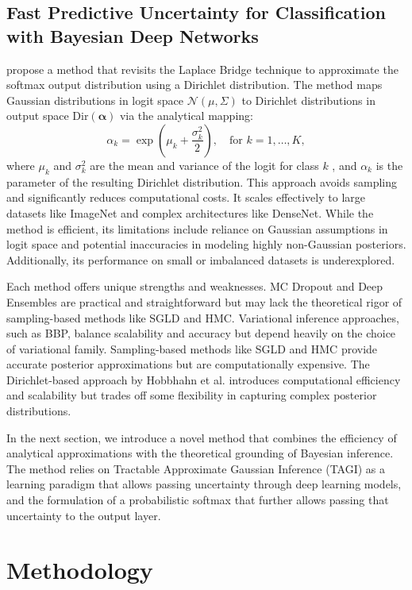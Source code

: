 \documentclass{article}
\begin{document}
\subsection{Fast Predictive Uncertainty for Classification with Bayesian Deep Networks}
\cite{hobbhahn22a} propose a method that revisits the Laplace Bridge technique to approximate the softmax output distribution using a Dirichlet distribution. The method maps Gaussian distributions in logit space  $\mathcal{N}(\mu, \Sigma)$  to Dirichlet distributions in output space  $\text{Dir}(\boldsymbol{\alpha})$  via the analytical mapping:
$$
\alpha_k = \exp\left(\mu_k + \frac{\sigma_k^2}{2}\right), \quad \text{for } k = 1, \ldots, K,
$$
where  $\mu_k$  and  $\sigma_k^2$  are the mean and variance of the logit for class  $k$ , and  $\alpha_k$  is the parameter of the resulting Dirichlet distribution. This approach avoids sampling and significantly reduces computational costs. It scales effectively to large datasets like ImageNet and complex architectures like DenseNet. While the method is efficient, its limitations include reliance on Gaussian assumptions in logit space and potential inaccuracies in modeling highly non-Gaussian posteriors. Additionally, its performance on small or imbalanced datasets is underexplored.

Each method offers unique strengths and weaknesses. MC Dropout and Deep Ensembles are practical and straightforward but may lack the theoretical rigor of sampling-based methods like SGLD and HMC. Variational inference approaches, such as BBP, balance scalability and accuracy but depend heavily on the choice of variational family. Sampling-based methods like SGLD and HMC provide accurate posterior approximations but are computationally expensive. The Dirichlet-based approach by Hobbhahn et al. introduces computational efficiency and scalability but trades off some flexibility in capturing complex posterior distributions.

In the next section, we introduce a novel method that combines the efficiency of analytical approximations with the theoretical grounding of Bayesian inference. The method relies on Tractable Approximate Gaussian Inference (TAGI) as a learning paradigm that allows passing uncertainty through deep learning models, and the formulation of a probabilistic softmax that further allows passing that uncertainty to the output layer.

\section{Methodology}\label{sec:methodology}
\end{document}
